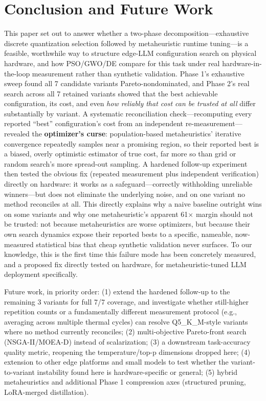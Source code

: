\documentclass[conference, letterpaper]{IEEEtran}
\begin{document}
\section{Conclusion and Future Work}
\label{sec:conclusion}

This paper set out to answer whether a two-phase decomposition---exhaustive discrete quantization selection followed by metaheuristic runtime tuning---is a feasible, worthwhile way to structure edge-LLM configuration search on physical hardware, and how PSO/GWO/DE compare for this task under real hardware-in-the-loop measurement rather than synthetic validation. Phase 1's exhaustive sweep found all 7 candidate variants Pareto-nondominated, and Phase 2's real search across all 7 retained variants showed that the best achievable configuration, its cost, and even \emph{how reliably that cost can be trusted at all} differ substantially by variant. A systematic reconciliation check---recomputing every reported ``best'' configuration's cost from an independent re-measurement---revealed the \textbf{optimizer's curse}: population-based metaheuristics' iterative convergence repeatedly samples near a promising region, so their reported best is a biased, overly optimistic estimator of true cost, far more so than grid or random search's more spread-out sampling. A hardened follow-up experiment then tested the obvious fix (repeated measurement plus independent verification) directly on hardware: it works as a safeguard---correctly withholding unreliable winners---but does not eliminate the underlying noise, and on one variant no method reconciles at all. This directly explains why a naive baseline outright wins on some variants and why one metaheuristic's apparent 61$\times$ margin should not be trusted: not because metaheuristics are worse optimizers, but because their own search dynamics expose their reported bests to a specific, nameable, now-measured statistical bias that cheap synthetic validation never surfaces. To our knowledge, this is the first time this failure mode has been concretely measured, and a proposed fix directly tested on hardware, for metaheuristic-tuned LLM deployment specifically.

Future work, in priority order: (1) extend the hardened follow-up to the remaining 3 variants for full 7/7 coverage, and investigate whether still-higher repetition counts or a fundamentally different measurement protocol (e.g., averaging across multiple thermal cycles) can resolve Q5\_K\_M-style variants where no method currently reconciles; (2) multi-objective Pareto-front search (NSGA-II/MOEA-D) instead of scalarization; (3) a downstream task-accuracy quality metric, reopening the temperature/top-p dimensions dropped here; (4) extension to other edge platforms and small models to test whether the variant-to-variant instability found here is hardware-specific or general; (5) hybrid metaheuristics and additional Phase 1 compression axes (structured pruning, LoRA-merged distillation).
\end{document}
